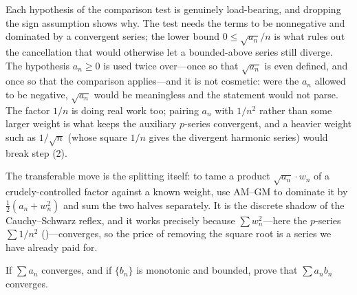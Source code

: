\documentclass[main.tex]{subfiles}
\begin{document}
\begin{Reflection}
Each hypothesis of the comparison test is genuinely load-bearing, and dropping the sign assumption shows
why. The test needs the terms to be nonnegative and dominated by a convergent series; the lower bound
$0\le\sqrt{a_n}/n$ is what rules out the cancellation that would otherwise let a bounded-above series
still diverge. The hypothesis $a_n\ge 0$ is used twice over---once so that $\sqrt{a_n}$ is even defined,
and once so that the comparison applies---and it is not cosmetic: were the $a_n$ allowed to be negative,
$\sqrt{a_n}$ would be meaningless and the statement would not parse. The factor $1/n$ is doing
real work too; pairing $a_n$ with $1/n^2$ rather than some larger weight is what keeps the auxiliary
$p$-series convergent, and a heavier weight such as $1/\sqrt{n}$ (whose square $1/n$ gives the divergent
harmonic series) would break step (2).

The transferable move is the splitting itself: to tame a product $\sqrt{a_n}\cdot w_n$ of a
crudely-controlled factor against a known weight, use AM--GM to dominate it by $\tfrac12(a_n+w_n^2)$ and
sum the two halves separately. It is the discrete shadow of the Cauchy--Schwarz reflex, and it works
precisely because $\sum w_n^2$---here the $p$-series $\sum 1/n^2$ ()---converges, so the
price of removing the square root is a series we have already paid for.
\end{Reflection}

If $\sum a_{n}$ converges, and if $\{b_{n}\}$ is monotonic and bounded, prove that $\sum a_{n} b_{n}$
converges.
\end{document}
